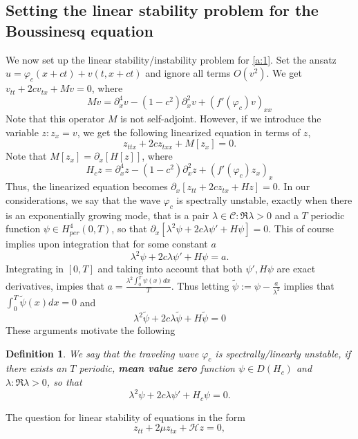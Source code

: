 \documentclass[final,11pt,leqno]{amsart}
\newtheorem{definition}{Definition}
\begin{document}
\subsection{Setting the linear stability problem for the Boussinesq equation}
We now set up the linear stability/instability  problem for \eqref{a:1}.  Set the ansatz $u={\varphi}_c(x+c t)+v(t, x+ct)$ and ignore all terms $O(v^2)$.
We get   $v_{tt}+2 c v_{t x}+ M v=0$, where
$$
M v={\partial}_x^4 v -(1-c^2){\partial}_x^2 v + (f'({\varphi}_c) v)_{xx}
$$
Note that this operator $M$ is not self-adjoint. However, if we introduce the variable $z: z_x=v$, we get the following linearized equation in terms of $z$,
\begin{equation}
\label{zz:2}
z_{ttx}+2 c z_{t xx}+ M[z_x]=0.
\end{equation}
Note that $M[z_x]={\partial}_x[H[z]]$, where
\begin{equation}
\label{z:2}
H_c z={\partial}_x^4 z-(1-c^2){\partial}_x^2 z + (f'({\varphi}_c) z_x)_{x}
\end{equation}
Thus, the linearized equation becomes ${\partial}_x[z_{tt}+2 c z_{tx}+ H z]=0$. In our considerations, we say that the wave ${\varphi}_c$ is spectrally unstable,
exactly when there is an exponentially growing mode, that is a pair ${\lambda}\in {\mathcal C}:\Re{\lambda}>0$ and  a  $T$ periodic function $\psi\in H_{per}^4(0,T)$,
so that ${\partial}_x[{\lambda}^2\psi+2 c {\lambda} \psi'+ H \psi]=0$. This of course implies upon integration that for some constant $a$
$$
{\lambda}^2\psi+2 c {\lambda} \psi'+ H \psi=a.
$$
Integrating in $[0,T]$ and taking into account that both $\psi', H\psi$ are exact derivatives, impies that $a={\frac{{{\lambda}^2 \int_0^T \psi(x)dx}}{{T}}}$.
Thus letting $\tilde{\psi}:=\psi-{\frac{{a}}{{{\lambda}^2}}}$ implies that $\int_0^T\tilde{\psi}(x) dx=0$ and
$$
{\lambda}^2\tilde{\psi}+2 c {\lambda} \tilde{\psi}+ H \tilde{\psi}=0
$$
These arguments motivate the following
\begin{definition}
\label{defi:1}
We say that the traveling wave ${\varphi}_c$ is spectrally/linearly unstable, if there exists
an $T$ periodic, {\bf mean value zero} function $\psi\in D(H_c)$ and ${\lambda}:\Re{\lambda} >0$,
so that
\begin{equation}
\label{55}
{\lambda}^2\psi+2 c {\lambda}\psi'+ H_c\psi=0.
\end{equation}
\end{definition}
 The question for linear stability of equations in the form
 \begin{equation}
 \label{a:10}
 z_{tt}+2\mu z_{tx}+{\mathcal H} z=0,
 \end{equation}
\end{document}
